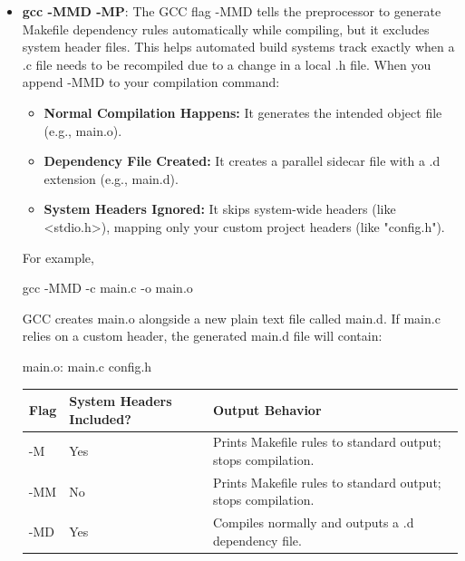 \documentclass{report}
\begin{document}
    \pagebreak 
    \begin{itemize}
        \item \textbf{gcc -MMD -MP}: The GCC flag -MMD tells the preprocessor to generate Makefile dependency rules automatically while compiling, but it excludes system header files. This helps automated build systems track exactly when a .c file needs to be recompiled due to a change in a local .h file.
            \bigbreak \noindent 
            When you append -MMD to your compilation command:
            \begin{itemize}
                \item \textbf{Normal Compilation Happens:} It generates the intended object file (e.g., main.o).
                \item \textbf{Dependency File Created:} It creates a parallel sidecar file with a .d extension (e.g., main.d).
                \item \textbf{System Headers Ignored:} It skips system-wide headers (like <stdio.h>), mapping only your custom project headers (like "config.h").
            \end{itemize}
            For example, 
            \bigbreak \noindent 
            \begin{bashcode}
            gcc -MMD -c main.c -o main.o
            \end{bashcode}
            \bigbreak \noindent 
            GCC creates main.o alongside a new plain text file called main.d. If main.c relies on a custom header, the generated main.d file will contain:
            \bigbreak \noindent 
            \begin{bashcode}
            main.o: main.c config.h
            \end{bashcode}
            \bigbreak \noindent 
            \begin{center}
                \begin{tabularx}{\textwidth}{@{}llX@{}}
                    \toprule
                    \textbf{Flag} &\textbf{System Headers Included?} &\textbf{Output Behavior}  \\
                    \midrule
                    -M &Yes & Prints Makefile rules to standard output; stops compilation.\\[2ex]
                    -MM& No &Prints Makefile rules to standard output; stops compilation.\\[2ex]
                    -MD& Yes &Compiles normally and outputs a .d dependency file.\\[2ex]

\end{tabularx}
\end{center}
\end{itemize}
\end{document}

